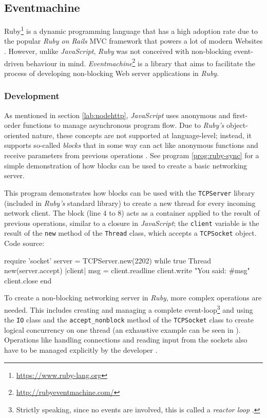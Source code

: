 \subsection{Eventmachine}
\label{sec:eventmachine}
Ruby\footnote{\url{https://www.ruby-lang.org}} is a dynamic programming language that has a high adoption rate due to the popular \textit{Ruby on Rails} MVC framework that powers a lot of modern Websites \cite[p. 11]{Orsini2008}. However, unlike \textit{JavaScript}, \textit{Ruby} was not conceived with non-blocking event-driven behaviour in mind. \textit{Eventmachine}\footnote{\url{http://rubyeventmachine.com/}} is a library that aims to facilitate the process of developing non-blocking Web server applications in \textit{Ruby}.

\subsubsection*{Development}
As mentioned in section \ref{lab:nodehttp}, \textit{JavaScript} uses anonymous and first-order functions to manage asynchronous program flow. Due to \textit{Ruby's} object-oriented nature, these concepts are not supported at language-level; instead, it supports so-called \textit{blocks} that in some way can act like anonymous functions and receive parameters from previous operations \cite{Fitzgerald2007}. See program \ref{prog:ruby-sync} for a simple demonstration of how blocks can be used to create a basic networking server.

\begin{program}
  \caption{This program demonstrates how blocks can be used with the \texttt{TCPServer} library (included in \textit{Ruby's} standard library) to create a new thread for every incoming network client. The block (line 4 to 8) acts as a container applied to the result of previous operations, similar to a closure in \textit{JavaScript}; the \texttt{client} variable is the result of the \texttt{new} method of the \texttt{Thread} class, which accepts a \texttt{TCPSocket} object. Code source: \cite {Gupta2010}}
  \label{prog:ruby-sync}
  \begin{JavaCode}
require 'socket'
server = TCPServer.new(2202)
while true
    Thread new(server.accept){ |client|
        msg = client.readline
        client.write "You said: #{msg}"
        client.close
    }
end
  \end{JavaCode}
\end{program}

To create a non-blocking networking server in \textit{Ruby}, more complex operations are needed. This includes creating and managing a complete event-loop\footnote{Strictly speaking, since no events are involved, this is called a \textit{reactor loop} \cite{Gupta2010}.} and using the \texttt{IO} class and the \texttt{accept\_nonblock} method of the \texttt{TCPSocket} class to create logical concurrency on one thread (an exhaustive example can be seen in \cite{Gupta2010}). Operations like handling connections and reading input from the sockets also have to be managed explicitly by the developer \cite{Gupta2010}.

